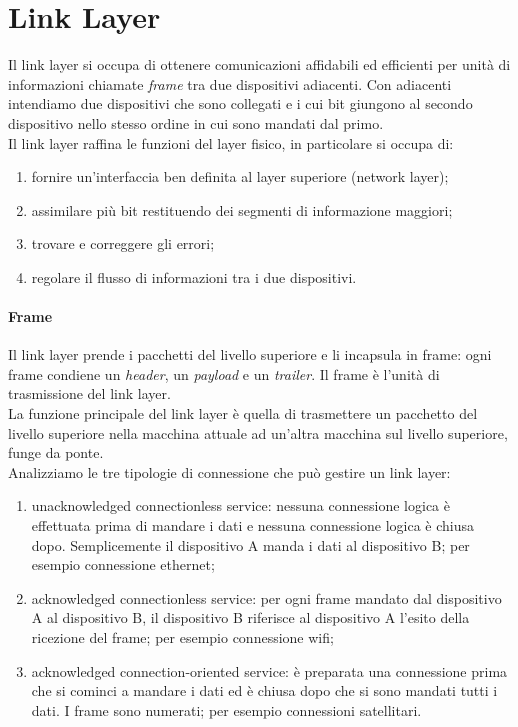 \documentclass{article}
\begin{document}
\section{Link Layer}
Il link layer si occupa di ottenere comunicazioni affidabili ed efficienti per
unità di informazioni chiamate \textit{frame} tra due dispositivi adiacenti. Con
adiacenti intendiamo due dispositivi che sono collegati e i cui bit giungono al
secondo dispositivo nello stesso ordine in cui sono mandati dal primo.\\
Il link layer raffina le funzioni del layer fisico, in particolare si occupa di:
\begin{enumerate}
	\item fornire un'interfaccia ben definita al layer superiore (network layer);

	\item assimilare più bit restituendo dei segmenti di informazione maggiori;

	\item trovare e correggere gli errori;

	\item regolare il flusso di informazioni tra i due dispositivi.
\end{enumerate}

\paragraph{Frame}
Il link layer prende i pacchetti del livello superiore e li incapsula in frame:
ogni frame condiene un \textit{header}, un \textit{payload} e un \textit{trailer}.
Il frame è l'unità di trasmissione del link layer.\\

La funzione principale del link layer è quella di trasmettere un pacchetto del
livello superiore nella macchina attuale ad un'altra macchina sul livello
superiore, funge da ponte.\\
Analizziamo le tre tipologie di connessione che può gestire un link layer:
\begin{enumerate}
	\item unacknowledged connectionless service: nessuna connessione logica è effettuata
	      prima di mandare i dati e nessuna connessione logica è chiusa dopo.
	      Semplicemente il dispositivo A manda i dati al dispositivo B; per
	      esempio connessione ethernet;

	\item acknowledged connectionless service: per ogni frame mandato dal
	      dispositivo A al dispositivo B, il dispositivo B riferisce al
	      dispositivo A l'esito della ricezione del frame; per esempio connessione
	      wifi;

	\item acknowledged connection-oriented service: è preparata una connessione prima che
	      si cominci a mandare i dati ed è chiusa dopo che si sono mandati tutti i
	      dati. I frame sono numerati; per esempio connessioni satellitari.
\end{enumerate}
\end{document}
